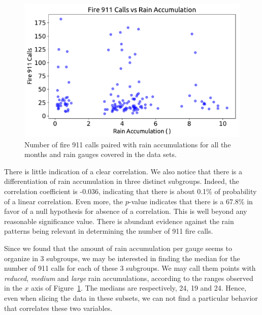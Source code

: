 \documentclass[12pt,a4paper]{article}
\begin{document}
\begin{figure}[ht!]
\centering
\includegraphics[scale=0.65]{figs/NoCor.pdf}
\caption{Number of fire 911 calls paired with rain accumulations for all the months and rain gauges covered in the data sets.}
\label{NoCor}
\end{figure}


There is little indication of a clear correlation. We also notice that there is a differentiation of rain accumulation in three distinct subgroups. Indeed, the correlation coefficient is -0.036, indicating that there is about 0.1\% of probability of a linear correlation. Even more, the $p$-value indicates that there is a 67.8\% in favor of a null hypothesis for absence of a correlation. This is well beyond any reasonable significance value. There is abundant evidence against the rain patterns being relevant in determining the number of 911 fire calls.

Since we found that the amount of rain accumulation per gauge seems to organize in 3 subgroups, we may be interested in finding the median for the number of 911 calls for each of these 3 subgroups. We may call them points with \emph{reduced}, \emph{medium} and \emph{large} rain accumulations, according to the ranges observed in the $x$ axis of Figure~\ref{NoCor}. The medians are respectively, 24, 19 and 24. Hence, even when slicing the data in these subsets, we can not find a particular behavior that correlates these two variables.
\end{document}
